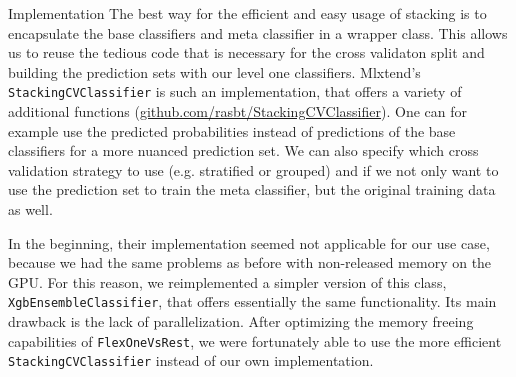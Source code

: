 \begin{section}{Implementation}
The best way for the efficient and easy usage of stacking is to encapsulate the base classifiers and meta classifier in a wrapper class. This allows us to reuse the tedious code that is necessary for the cross validaton split and building the prediction sets with our level one classifiers. Mlxtend's \texttt{StackingCVClassifier} is such an implementation, that offers a variety of additional functions (\href{http://rasbt.github.io/mlxtend/user_guide/classifier/StackingCVClassifier/}{github.com/rasbt/StackingCVClassifier}). One can for example use the predicted probabilities instead of predictions of the base classifiers for a more nuanced prediction set. We can also specify which cross validation strategy to use (e.g. stratified or grouped) and if we not only want to use the prediction set to train the meta classifier, but the original training data as well.

In the beginning, their implementation seemed not applicable for our use case, because we had the same problems as before with non-released memory on the GPU. For this reason, we reimplemented a simpler version of this class, \texttt{XgbEnsembleClassifier}, that offers essentially the same functionality. Its main drawback is the lack of parallelization. After optimizing the memory freeing capabilities of \texttt{FlexOneVsRest}, we were fortunately able to use the more efficient \texttt{StackingCVClassifier} instead of our own implementation.

\end{section}
